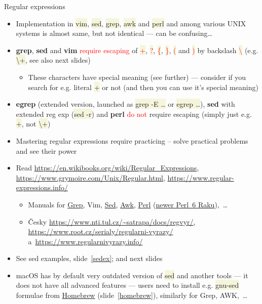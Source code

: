 \documentclass[compress, xelatex, 11pt, xcolor=svgnames, aspectratio=169, url={hyphens, lowtilde}]{beamer}
\renewcommand{\texttt}[1]{\colorbox{Beige}{{\ttfamily #1}}}
\renewcommand{\alert}[1]{\textcolor{red}{#1}}
\begin{document}
\begin{frame}[allowframebreaks]{Regular expressions}
	\label{regexp}
	\begin{itemize}
		\item Implementation in \texttt{vim}, \texttt{sed}, \texttt{grep}, \texttt{awk} and \texttt{perl} and among various UNIX systems is almost same, but not identical --- can be confusing\ldots
		\item \textbf{grep}, \textbf{sed} and \textbf{vim} \alert{require escaping} of \alert{\texttt{+}}, \alert{\texttt{?}}, \alert{\texttt{\{}}, \alert{\texttt{\}}}, \alert{\texttt{(}} and \alert{\texttt{)}} by backslash \alert{\texttt{\textbackslash}} (e.g. \texttt{\textbackslash +}, see also next slides)
		\begin{itemize}
			\item These characters have special meaning (see further) --- consider if you search for e.g. literal \texttt{+} or not (and then you can use it's special meaning)
		\end{itemize}
		\item \textbf{egrep} (extended version, launched as \texttt{grep -E \ldots} or \texttt{egrep \ldots}), \textbf{sed} with extended reg exp (\texttt{sed -r}) and \textbf{perl} \alert{do not} require escaping (simply just e.g. \texttt{+}, not \texttt{\textbackslash +})
		\item Mastering regular expressions require practicing -- solve practical problems and see their power
		\item Read \url{https://en.wikibooks.org/wiki/Regular_Expressions}, \url{https://www.grymoire.com/Unix/Regular.html}, \url{https://www.regular-expressions.info/}
		\begin{itemize}
			\item Manuals for \href{https://www.gnu.org/software/grep/manual/}{Grep}, Vim, \href{https://www.gnu.org/software/sed/manual/}{Sed}, \href{https://www.gnu.org/software/gawk/manual/}{Awk}, \href{https://en.wikibooks.org/wiki/Perl_Programming}{Perl} (\href{https://en.wikibooks.org/wiki/Raku_Programming}{newer Perl~6 Raku}),~\ldots
			\item Česky \url{https://www.nti.tul.cz/~satrapa/docs/regvyr/}, \url{https://www.root.cz/serialy/regularni-vyrazy/} a~\url{https://www.regularnivyrazy.info/}
		\end{itemize}
		\item See sed examples, slide~\ref{sedex}; and next slides
		\item macOS has by default very outdated version of \texttt{sed} and another tools --- it does not have all advanced features --- users need to install e.g. \texttt{gnu-sed} formulae from \href{https://brew.sh/}{Homebrew} (slide~\ref{homebrew}), similarly for Grep, AWK,~\ldots

\end{itemize}
\end{frame}
\end{document}
